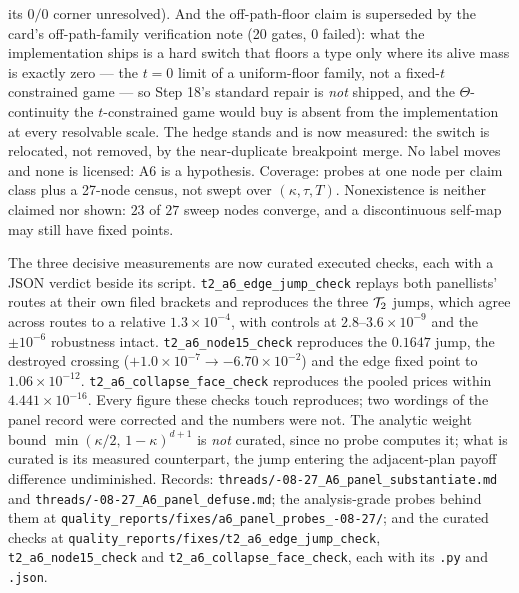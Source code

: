 \begin{remark}
its $0/0$ corner unresolved). And the off-path-floor claim is superseded by the card's
off-path-family verification note (20 gates, 0 failed): what the implementation ships is a hard
switch that floors a type only where its alive mass is exactly zero --- the $t = 0$ limit of a
uniform-floor family, not a fixed-$t$ constrained game --- so Step 18's standard repair is
\emph{not} shipped, and the $\Theta$-continuity the $t$-constrained game would buy is absent from
the implementation at every resolvable scale. The hedge stands and is now measured: the switch is
relocated, not removed, by the near-duplicate breakpoint merge. No label moves and none is
licensed: A6 is a hypothesis. Coverage: probes at one node per claim class plus a 27-node
census, not swept over $(\kappa,\tau,T)$. Nonexistence is neither claimed nor shown: $23$ of $27$
sweep nodes converge, and a discontinuous self-map may still have fixed points.

The three decisive measurements are now curated executed checks, each with a JSON verdict beside its
script. \texttt{t2\_a6\_edge\_jump\_check} replays both panellists' routes at their own filed
brackets and reproduces the three $\mathcal{T}_2$ jumps, which agree across routes to a relative
$1.3\times10^{-4}$, with controls at $2.8$--$3.6\times10^{-9}$ and the $\pm10^{-6}$ robustness
intact. \texttt{t2\_a6\_node15\_check} reproduces the $0.1647$ jump, the destroyed crossing
($+1.0\times10^{-7} \to -6.70\times10^{-2}$) and the edge fixed point to $1.06\times10^{-12}$.
\texttt{t2\_a6\_collapse\_face\_check} reproduces the pooled prices within $4.441\times10^{-16}$.
Every figure these checks touch reproduces; two wordings of the panel record were corrected and the
numbers were not. The analytic weight bound $\min(\kappa/2,\,1-\kappa)^{d+1}$ is \emph{not} curated,
since no probe computes it; what is curated is its measured counterpart, the jump entering the
adjacent-plan payoff difference undiminished. Records:
\texttt{threads/-08-27\_A6\_\allowbreak panel\_substantiate.md} and
\texttt{threads/-08-27\_A6\_\allowbreak panel\_defuse.md}; the analysis-grade probes
behind them at
\texttt{quality\_reports/\allowbreak fixes/\allowbreak a6\_panel\_probes\_-08-27/};
and the curated checks at
\texttt{quality\_reports/\allowbreak fixes/\allowbreak t2\_a6\_\allowbreak edge\_jump\_check},
\texttt{t2\_a6\_\allowbreak node15\_check} and \texttt{t2\_a6\_\allowbreak collapse\_face\_check},
each with its \texttt{.py} and \texttt{.json}.
\end{remark}

